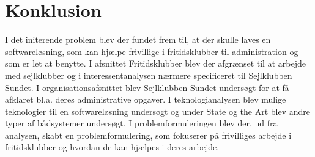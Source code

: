 \section{Konklusion}
I det initerende problem blev der fundet frem til, at der skulle laves en softwareløsning, som kan hjælpe frivillige i fritidsklubber til administration og som er let at benytte. 
I afsnittet Fritidsklubber blev der afgrænset til at arbejde med sejlklubber og i interessentanalysen nærmere specificeret til Sejlklubben Sundet. 
I organisationsafsnittet blev Sejlklubben Sundet undersøgt for at få afklaret bl.a. deres administrative opgaver. 
I teknologianalysen blev mulige teknologier til en softwareløsning undersøgt og under State og the Art blev andre typer af bådsystemer undersøgt. 
I problemformuleringen blev der, ud fra analysen, skabt en problemformulering, som fokuserer på frivilliges arbejde i fritidsklubber og hvordan de kan hjælpes i deres arbejde. 



